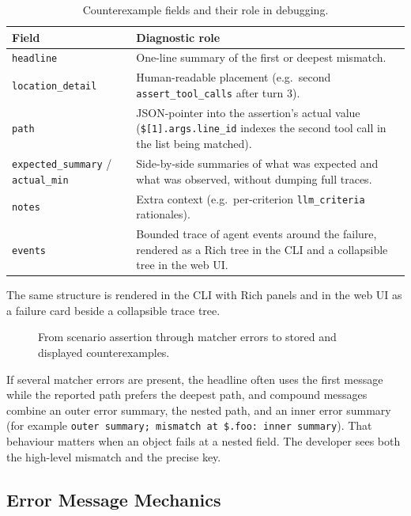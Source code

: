 \begin{table}[htbp]
\centering
\small
\begin{tabularx}{\textwidth}{p{}X}
\toprule
\textbf{Field} & \textbf{Diagnostic role} \\
\midrule
\texttt{headline} &
One-line summary of the first or deepest mismatch. \\
\texttt{location\_detail} &
Human-readable placement (e.g.\ second \texttt{assert\_tool\_calls} after turn 3). \\
\texttt{path} &
JSON-pointer into the assertion's actual value (\texttt{\$[1].args.line\_id} indexes the second tool call in the list being matched). \\
\texttt{expected\_summary} / \texttt{actual\_min} &
Side-by-side summaries of what was expected and what was observed, without dumping full traces. \\
\texttt{notes} &
Extra context (e.g.\ per-criterion \texttt{llm\_criteria} rationales). \\
\texttt{events} &
Bounded trace of agent events around the failure, rendered as a Rich tree in the CLI and a collapsible tree in the web UI. \\
\bottomrule
\end{tabularx}
\caption{Counterexample fields and their role in debugging.}
\label{tab:counterexample-fields}
\end{table}

The same structure is rendered in the CLI with Rich panels and in the web UI as a failure card beside a collapsible trace tree.

\begin{figure}[htbp]
  \centering
  \resizebox{\textwidth}{!}{%
  }
  \caption{From scenario assertion through matcher errors to stored and displayed counterexamples.}
  \label{fig:failure-pipeline}
\end{figure}

If several matcher errors are present, the headline often uses the first message while the reported path prefers the deepest path, and compound messages combine an outer error summary, the nested path, and an inner error summary (for example \texttt{outer summary; mismatch at \$.foo: inner summary}). That behaviour matters when an object fails at a nested field. The developer sees both the high-level mismatch and the precise key.

\subsection{Error Message Mechanics}

